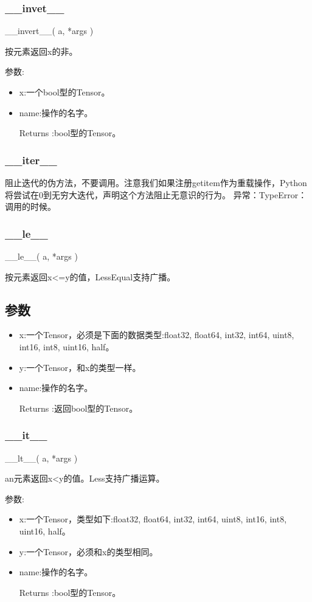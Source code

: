 \subsubsection{\_\_invet\_\_}
\begin{python}
__invert__(
    a,
    *args
)
\end{python}
按元素返回x的非。

参数:
\begin{itemize}
\item x:一个bool型的Tensor。
\item name:操作的名字。
\item[Returns]:bool型的Tensor。
\end{itemize}
\subsubsection{\_\_iter\_\_}
阻止迭代的伪方法，不要调用。注意我们如果注册getitem作为重载操作，Python将尝试在0到无穷大迭代，声明这个方法阻止无意识的行为。
异常：TypeError：调用的时候。
\subsubsection{\_\_le\_\_}
\begin{python}
__le__(
    a,
    *args
)
\end{python}
按元素返回x<=y的值，LessEqual支持广播。

\subsection{参数}
\begin{itemize}
	\item x:一个Tensor，必须是下面的数据类型:float32, float64, int32, int64, uint8, int16, int8, uint16, half。
	\item y:一个Tensor，和x的类型一样。
	\item name:操作的名字。
	\item[Returns]:返回bool型的Tensor。
	\end{itemize}
\subsubsection{\_\_it\_\_}
\begin{python}
__lt__(
    a,
    *args
)
\end{python}
an元素返回x<y的值。Less支持广播运算。

参数:
\begin{itemize}
	\item x:一个Tensor，类型如下:float32, float64, int32, int64, uint8, int16, int8, uint16, half。
	\item y:一个Tensor，必须和x的类型相同。
	\item name:操作的名字。
	\item[Returns]:bool型的Tensor。
\end{itemize}
